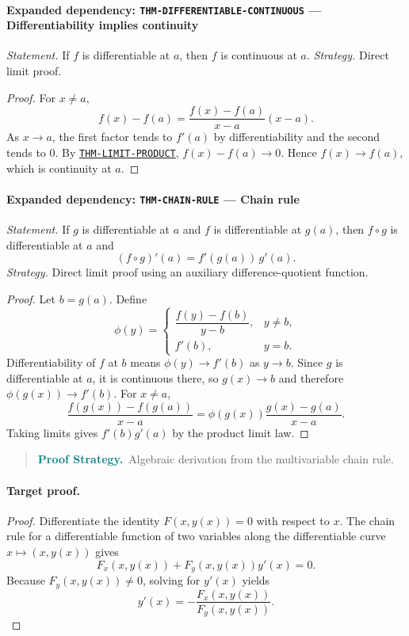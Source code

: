 \documentclass[10pt]{article}
\newcommand{\pidraw}[1]{\begingroup\urlstyle{tt}\nolinkurl{#1}\endgroup}
\newcommand{\pidref}[1]{\hyperref[prf:#1]{\pidraw{#1}}}
\newcommand{\pid}[1]{\pidref{#1}}
\theoremstyle{definition}
\theoremstyle{remark}
\newenvironment{proofstrategy}
{\begin{quote}\small\noindent\textbf{\textcolor{teal}{Proof Strategy.}}\ }
{\end{quote}}
\begin{document}
\paragraph{Expanded dependency: \pidraw{THM-DIFFERENTIABLE-CONTINUOUS} --- Differentiability implies continuity}
\textit{Statement.} If $f$ is differentiable at $a$, then $f$ is continuous at $a$.
\textit{Strategy.} Direct limit proof.
\begin{proof}For $x\ne a$,
\[
f(x)-f(a)=
\frac{f(x)-f(a)}{x-a}(x-a).
\]
As $x\to a$, the first factor tends to $f'(a)$ by differentiability and the
second tends to $0$. By \pid{THM-LIMIT-PRODUCT},
$f(x)-f(a)\to0$. Hence $f(x)\to f(a)$, which is continuity at $a$.\end{proof}

\paragraph{Expanded dependency: \pidraw{THM-CHAIN-RULE} --- Chain rule}
\textit{Statement.} If $g$ is differentiable at $a$ and $f$ is differentiable at $g(a)$, then $f\circ g$ is differentiable at $a$ and
\[
(f\circ g)'(a)=f'(g(a))\,g'(a).
\]
\textit{Strategy.} Direct limit proof using an auxiliary difference-quotient function.
\begin{proof}Let $b=g(a)$. Define
\[
\phi(y)=
\begin{cases}
\dfrac{f(y)-f(b)}{y-b},&y\ne b,\\[4pt]
f'(b),&y=b.
\end{cases}
\]
Differentiability of $f$ at $b$ means $\phi(y)\to f'(b)$ as $y\to b$.
Since $g$ is differentiable at $a$, it is continuous there, so $g(x)\to b$ and
therefore $\phi(g(x))\to f'(b)$. For $x\ne a$,
\[
\frac{f(g(x))-f(g(a))}{x-a}
=
\phi(g(x))\frac{g(x)-g(a)}{x-a}.
\]
Taking limits gives $f'(b)g'(a)$ by the product limit law.\end{proof}

\begin{proofstrategy}Algebraic derivation from the multivariable chain rule.\end{proofstrategy}

\paragraph{Target proof.}

\begin{proof}

Differentiate the identity $F(x,y(x))=0$ with respect to $x$. The chain rule for
a differentiable function of two variables along the differentiable curve
$x\mapsto(x,y(x))$ gives
\[
F_x(x,y(x))+F_y(x,y(x))y'(x)=0.
\]
Because $F_y(x,y(x))\ne0$, solving for $y'(x)$ yields
\[
y'(x)=-\frac{F_x(x,y(x))}{F_y(x,y(x))}.
\]

\end{proof}
\end{document}
